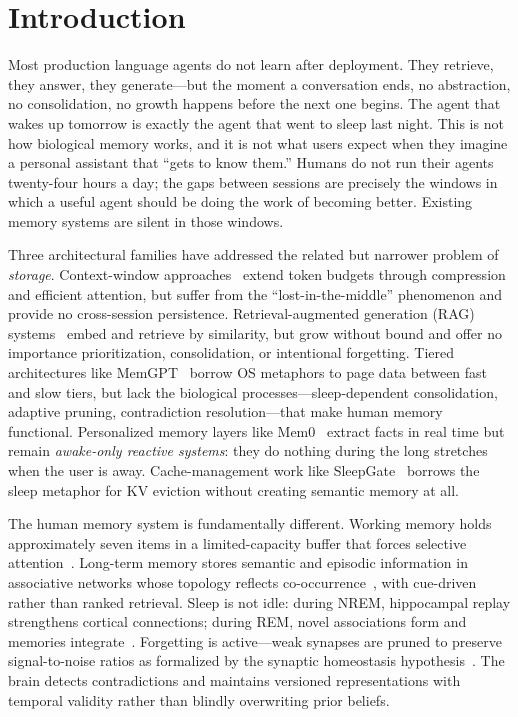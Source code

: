 \documentclass[11pt,twocolumn]{article}
\begin{document}
\tableofcontents

\newpage

\section{Introduction}

Most production language agents do not learn after deployment. They retrieve, they answer, they generate---but the moment a conversation ends, no abstraction, no consolidation, no growth happens before the next one begins. The agent that wakes up tomorrow is exactly the agent that went to sleep last night. This is not how biological memory works, and it is not what users expect when they imagine a personal assistant that ``gets to know them.'' Humans do not run their agents twenty-four hours a day; the gaps between sessions are precisely the windows in which a useful agent should be doing the work of becoming better. Existing memory systems are silent in those windows.

Three architectural families have addressed the related but narrower problem of \emph{storage}. Context-window approaches~\cite{liu2023lost} extend token budgets through compression and efficient attention, but suffer from the ``lost-in-the-middle'' phenomenon and provide no cross-session persistence. Retrieval-augmented generation (RAG) systems~\cite{lewis2020rag} embed and retrieve by similarity, but grow without bound and offer no importance prioritization, consolidation, or intentional forgetting. Tiered architectures like MemGPT~\cite{packer2023memgpt} borrow OS metaphors to page data between fast and slow tiers, but lack the biological processes---sleep-dependent consolidation, adaptive pruning, contradiction resolution---that make human memory functional. Personalized memory layers like Mem0~\cite{mem0} extract facts in real time but remain \emph{awake-only reactive systems}: they do nothing during the long stretches when the user is away. Cache-management work like SleepGate~\cite{xie2026sleepgate} borrows the sleep metaphor for KV eviction without creating semantic memory at all.

The human memory system is fundamentally different. Working memory holds approximately seven items in a limited-capacity buffer that forces selective attention~\cite{miller1956}. Long-term memory stores semantic and episodic information in associative networks whose topology reflects co-occurrence~\cite{tulving2002}, with cue-driven rather than ranked retrieval. Sleep is not idle: during NREM, hippocampal replay strengthens cortical connections; during REM, novel associations form and memories integrate~\cite{rasch2013sleep}. Forgetting is active---weak synapses are pruned to preserve signal-to-noise ratios as formalized by the synaptic homeostasis hypothesis~\cite{tononi2003sleep}. The brain detects contradictions and maintains versioned representations with temporal validity rather than blindly overwriting prior beliefs.
\end{document}
